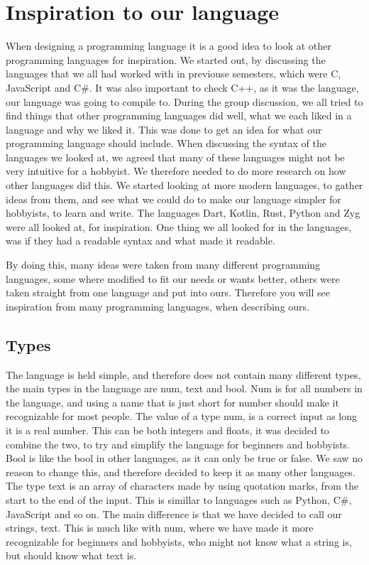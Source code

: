 \section{Inspiration to our language}
When designing a programming language it is a good idea to look at other programming languages for inspiration. We started out, by discussing the languages that we all had worked with in previouse semesters, which were C, JavaScript and C\#. It was also important to check C++, as it was the language, our language was going to compile to.
During the group discussion, we all tried to find things that other programming languages did well, what we each liked in a language and why we liked it. This was done to get an idea for what our programming language should include.
When discussing the syntax of the languages we looked at, we agreed that many of these languages might not be very intuitive for a hobbyist. We therefore needed to do more research on how other languages did this. 
We started looking at more modern languages, to gather ideas from them, and see what we could do to make our language simpler for hobbyists, to learn and write. The languages Dart, Kotlin, Rust, Python and Zyg were all looked at, for inspiration. One thing we all looked for in the languages, was if they had a readable syntax and what made it readable.

By doing this, many ideas were taken from many different programming languages, some where modified to fit our needs or wants better, others were taken straight from one language and put into ours. Therefore you will see inspiration from many programming languages, when describing ours.  



\subsection{Types}
The language is held simple, and therefore does not contain many different types, the main types in the language are num, text and bool. Num is for all numbers in the language, and using a name that is just short for number should make it recognizable for most people. The value of a type num, is a correct input as long it is a real number. This can be both integers and floats, it was decided to combine the two, to try and simplify the language for beginners and hobbyists.
Bool is like the bool in other languages, as it can only be true or false. We saw no reason to change this, and therefore decided to keep it as many other languages.
The type text is an array of characters made by using quotation marks, from the start to the end of the input. This is simillar to languages such as Python, C\#, JavaScript and so on. The main difference is that we have decided to call our strings, text. This is much like with num, where we have made it more recognizable for beginners and hobbyists, who might not know what a string is, but should know what text is.
 
